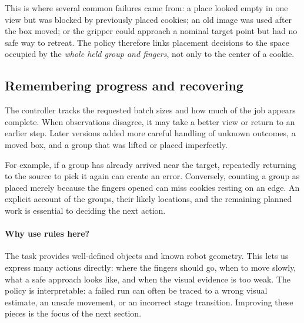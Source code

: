 This is where several common failures came from: a place looked empty in one view but was blocked by previously placed cookies; an old image was used after the box moved; or the gripper could approach a nominal target point but had no safe way to retreat. The policy therefore links placement decisions to the space occupied by the \emph{whole held group and fingers}, not only to the center of a cookie.

\subsection{Remembering progress and recovering}
The controller tracks the requested batch sizes and how much of the job appears complete. When observations disagree, it may take a better view or return to an earlier step. Later versions added more careful handling of unknown outcomes, a moved box, and a group that was lifted or placed imperfectly.

For example, if a group has already arrived near the target, repeatedly returning to the source to pick it again can create an error. Conversely, counting a group as placed merely because the fingers opened can miss cookies resting on an edge. An explicit account of the groups, their likely locations, and the remaining planned work is essential to deciding the next action.

\paragraph{Why use rules here?}
The task provides well-defined objects and known robot geometry. This lets us express many actions directly: where the fingers should go, when to move slowly, what a safe approach looks like, and when the visual evidence is too weak. The policy is interpretable: a failed run can often be traced to a wrong visual estimate, an unsafe movement, or an incorrect stage transition. Improving these pieces is the focus of the next section.
